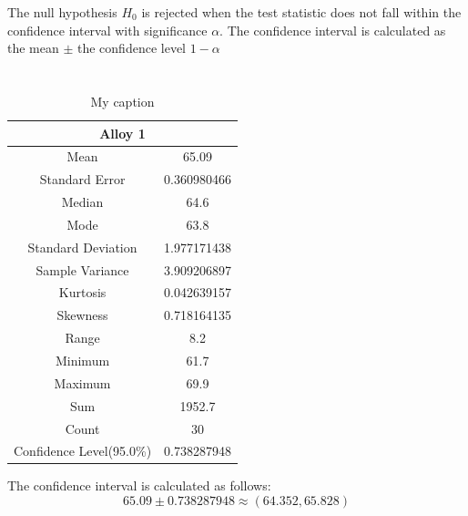 \documentclass[letterpaper]{article}
\begin{document}
The null hypothesis $H_0$ is rejected when the test statistic
does not fall within the confidence interval with significance $\alpha$.
The confidence interval is calculated as the mean $\pm$ the confidence level $1-\alpha$


\section{}%
\subsection{}%

\begin{table}[H]
 \centering
 \begin{tabular}{|c|c|}
  \hline
  \multicolumn{2}{|c|}{Alloy 1}          \\ \hline
  Mean                     & 65.09       \\ \hline
  Standard Error           & 0.360980466 \\ \hline
  Median                   & 64.6        \\ \hline
  Mode                     & 63.8        \\ \hline
  Standard Deviation       & 1.977171438 \\ \hline
  Sample Variance          & 3.909206897 \\ \hline
  Kurtosis                 & 0.042639157 \\ \hline
  Skewness                 & 0.718164135 \\ \hline
  Range                    & 8.2         \\ \hline
  Minimum                  & 61.7        \\ \hline
  Maximum                  & 69.9        \\ \hline
  Sum                      & 1952.7      \\ \hline
  Count                    & 30          \\ \hline
  Confidence Level(95.0\%) & 0.738287948 \\ \hline
 \end{tabular}
 \caption{My caption}
 \label{3a1}
\end{table}

The confidence interval is calculated as follows:
$$65.09 \pm 0.738287948 \approx (64.352, 65.828)$$
\end{document}
